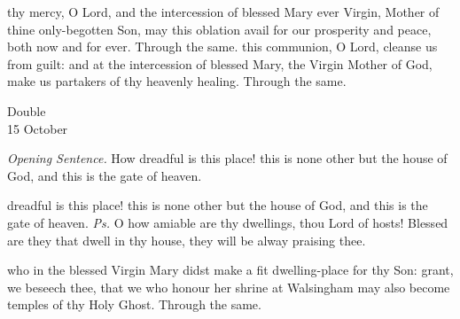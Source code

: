 \secret
{} thy mercy, O Lord, and the intercession of blessed Mary ever Virgin, Mother of thine only-begotten Son, may this oblation avail for our prosperity and peace, both now and for ever. Through the same.
\postcommunion
{} this communion, O Lord, cleanse us from guilt: and at the intercession of blessed Mary, the Virgin Mother of God, make us partakers of thy heavenly healing. Through the same.


\begin{inhead}
	{Double\\
		15 October}
\end{inhead}
\par\noindent
\textit{Opening Sentence.} How dreadful is this place! this is none other but the house of God, and this is the gate of heaven.%

\introit
{} dreadful is this place! this is none other but the house of God, and this is the gate of heaven. \textit{Ps.} O how amiable are thy dwellings, thou Lord of hosts! Blessed are they that dwell in thy house, they will be alway praising thee.

\collect
{} who in the blessed Virgin Mary didst make a fit dwelling-place for thy Son: grant, we beseech thee, that we who honour her shrine at Walsingham may also become temples of thy Holy Ghost. Through the same.

